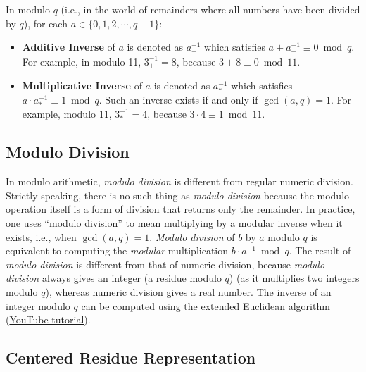 \begin{tcolorbox}[title={\textbf{\tboxdef{\ref*{subsec:modulo-inverse}} Inverse in Modulo Arithmetic}}]

In modulo $q$ (i.e., in the world of remainders where all numbers have been divided by $q$), for each $a \in \{0, 1, 2, \cdots, q-1\}$:

\begin{itemize}

\item \textbf{Additive Inverse} of $a$ is denoted as $a_+^{-1}$ which satisfies $a + a_+^{-1} \equiv 0 \bmod q$. For example, in modulo 11, $3_+^{-1} = 8$, because $3 + 8 \equiv 0 \bmod 11$.

\item \textbf{Multiplicative Inverse} of $a$ is denoted as $a_*^{-1}$ which satisfies $a \cdot a_*^{-1} \equiv 1 \bmod{q}$. Such an inverse exists if and only if $\gcd(a,q)=1$. For example, modulo 11, $3_*^{-1} = 4$, because $3 \cdot 4 \equiv 1 \bmod{11}$.

\end{itemize}

\end{tcolorbox}

\subsection{Modulo Division}
\label{subsec:modulo-division}

In modulo arithmetic, \textit{modulo division} is different from regular numeric division. Strictly speaking, there is no such thing as \textit{modulo division} because the modulo operation itself is a form of division that returns only the remainder. In practice, one uses “modulo division” to mean multiplying by a modular inverse when it exists, i.e., when $\gcd(a,q)=1$. \textit{Modulo division} of $b$ by $a$ modulo $q$ is equivalent to computing the \textit{modular} multiplication $b \cdot a^{-1} \bmod q$. The result of \textit{modulo division} is different from that of numeric division, because \textit{modulo division} always gives an integer (a residue modulo $q$) (as it multiplies two integers modulo $q$), whereas numeric division gives a real number. The inverse of an integer modulo $q$ can be computed using the extended Euclidean algorithm (\href{https://www.youtube.com/watch?v=fz1vxq5ts5I}{YouTube tutorial}).

\subsection{Centered Residue Representation}
\label{subsec:modulo-centered}

